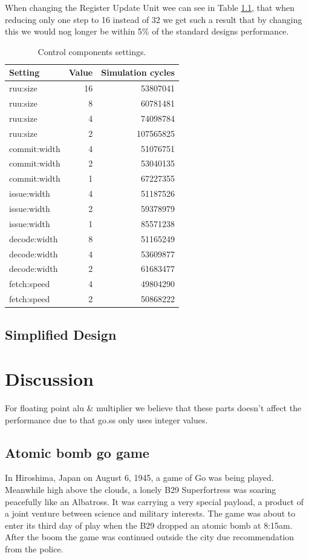 \documentclass[titlepage, a4paper]{article}
\begin{document}
When changing the Register Update Unit wee can see in Table \ref{}, that when reducing only one step to 16 instead of 32 we get such a result that by changing this we would nog longer be within 5\% of the standard designs performance.

\begin{table}[H]
\centering
\caption{Control components settings.}

\begin{tabular}{|l|r|r|}
  \hline
  \textbf{Setting} & \textbf{Value} & \textbf{Simulation cycles}\\ \hline
  ruu:size & 16 & 53807041 \\ \hline
  ruu:size & 8 & 60781481 \\ \hline
  ruu:size & 4 & 74098784 \\ \hline
  ruu:size & 2 & 107565825 \\ \hline
  commit:width & 4 & 51076751 \\ \hline
  commit:width & 2 & 53040135 \\ \hline
  commit:width & 1 & 67227355 \\ \hline
  issue:width & 4 & 51187526 \\ \hline
  issue:width & 2 & 59378979 \\ \hline
  issue:width & 1 & 85571238 \\ \hline
  decode:width & 8 & 51165249 \\ \hline
  decode:width & 4 & 53609877 \\ \hline
  decode:width & 2 & 61683477 \\ \hline
  fetch:speed & 4 & 49804290 \\ \hline
  fetch:speed & 2 & 50868222 \\ \hline
\end{tabular}

\label{tab:floatingpoint}
\end{table}

\subsection{Simplified Design}

\section{Discussion}
For floating point alu \& multiplier we believe that these parts doesn't affect the performance due to that go.ss only uses integer values.

\subsection{Atomic bomb go game}
In Hiroshima, Japan on August 6, 1945, a game of Go was being played. Meanwhile high above the clouds, a lonely B29 Superfortress was soaring peacefully like an Albatross. It was carrying a very special payload, a product of a joint venture between science and military interests. The game was about to enter its third day of play when the B29 dropped an atomic bomb at 8:15am. After the boom the game was continued outside the city due recommendation from the police.
\end{document}

